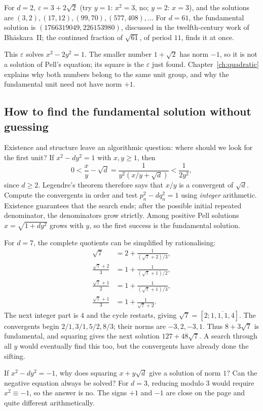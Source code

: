\begin{example}
For $d=2$, $\varepsilon=3+2\sqrt2$ (try $y=1$: $x^2=3$, no; $y=2$: $x=3$), and the solutions are $(3,2),(17,12),(99,70),(577,408),\dots$ For $d=61$, the fundamental solution is $(1766319049,226153980)$, discussed in the twelfth-century work of Bh\=askara~II; the continued fraction of $\sqrt{61}$, of period $11$, finds it at once.
\end{example}

This $\varepsilon$ solves $x^2-2y^2=1$. The smaller number $1+\sqrt2$ has norm $-1$, so it is not a solution of Pell's equation; its square is the $\varepsilon$ just found. Chapter~\ref{ch:quadratic} explains why both numbers belong to the same unit group, and why the fundamental unit need not have norm $+1$.

\subsection*{How to find the fundamental solution without guessing}
Existence and structure leave an algorithmic question: where should we look for the first unit? If $x^2-dy^2=1$ with $x,y\ge1$, then
\[
0<\frac xy-\sqrt d
=\frac{1}{y^2(x/y+\sqrt d)}
<\frac1{2y^2},
\]
since $d\ge2$. Legendre's theorem therefore says that $x/y$ is a convergent of $\sqrt d$. Compute the convergents in order and test $p_n^2-dq_n^2=1$ using \emph{integer} arithmetic. Existence guarantees that the search ends; after the possible initial repeated denominator, the denominators grow strictly. Among positive Pell solutions $x=\sqrt{1+dy^2}$ grows with $y$, so the first success is the fundamental solution.

For $d=7$, the complete quotients can be simplified by rationalising:
\[
\begin{aligned}
\sqrt7&=2+\frac1{(\sqrt7+2)/3},\\
\frac{\sqrt7+2}{3}&=1+\frac1{(\sqrt7+1)/2},\\
\frac{\sqrt7+1}{2}&=1+\frac1{(\sqrt7+1)/3},\\
\frac{\sqrt7+1}{3}&=1+\frac1{\sqrt7+2}.
\end{aligned}
\]
The next integer part is $4$ and the cycle restarts, giving $\sqrt7=[2;\overline{1,1,1,4}]$. The convergents begin $2/1,3/1,5/2,8/3$; their norms are $-3,2,-3,1$. Thus $8+3\sqrt7$ is fundamental, and squaring gives the next solution $127+48\sqrt7$. A search through all $y$ would eventually find this too, but the convergents have already done the sifting.

\begin{think}
If $x^2-dy^2=-1$, why does squaring $x+y\sqrt d$ give a solution of norm $1$? Can the negative equation always be solved? For $d=3$, reducing modulo $3$ would require $x^2\equiv-1$, so the answer is no. The signs $+1$ and $-1$ are close on the page and quite different arithmetically.
\end{think}

